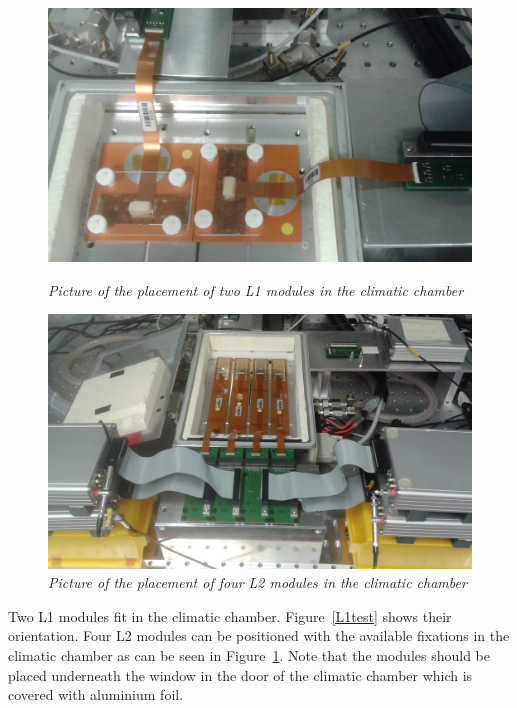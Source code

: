 \documentclass[a4paper,12pt,twoside]{article}
\begin{document}
\begin{figure} [h!]
\centering
\begin{minipage}{.49\textwidth}
  \centering
  \includegraphics[width=\textwidth]{./Figures/L1test.jpg}
  \caption{\em Picture of the placement of two L1 modules in the climatic chamber}
  \label{L1test}
\end{minipage}%
\hspace{1mm}
\begin{minipage}{.49\textwidth}
  \centering
  \includegraphics[width=\textwidth]{./Figures/L2test.jpg}
  \caption{\em Picture of the placement of four L2 modules in the climatic chamber}
  \label{L2test}
\end{minipage}
\end{figure}

Two L1 modules fit in the climatic chamber. Figure~\ref{L1test} shows their orientation.
Four L2 modules can be positioned with the available fixations in the climatic chamber as can be seen in Figure~\ref{L2test}. Note that the modules should be placed underneath the window in the door of the climatic chamber which is covered with aluminium foil. 
\end{document}
